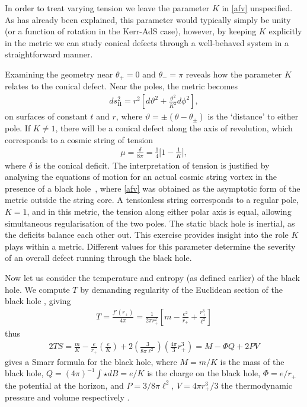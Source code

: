 \documentclass[
twoside,
openright,
frontopenright,
]{dmathesis}
\begin{document}
In order to treat varying tension we leave the parameter $K$ in \cref{afv}
unspecified. As has already been explained, this parameter would typically
simply be unity (or a function of rotation in the Kerr-AdS case), however, by
keeping $K$ explicitly in the metric we can study conical defects through a
well-behaved system in a straightforward manner.

Examining the geometry near $\theta_+ = 0$ and $\theta_- = \pi$ reveals how the
parameter $K$ relates to the conical defect. Near the poles, the metric becomes
\begin{align}
ds_{\mathrm{II}}^2 = r^2 \left[ d\vartheta^2 + \frac{\vartheta^2}{K^2} d\phi^2\right],
\end{align}
on surfaces of constant $t$ and $r$, where
$\vartheta = \pm (\theta - \theta_\pm)$ is the `distance' to either pole. If
$K\neq 1$, there will be a conical defect along the axis of revolution, which
corresponds to a cosmic string of tension
\begin{align}
\mu = \frac{\delta}{8\pi} = \frac14 \bigg[1-\frac{1}{K}\bigg],
\label{afvtension}
\end{align}
where $\delta$ is the conical deficit. The interpretation of tension is
justified by analysing the equations of motion for an actual cosmic string
vortex in the presence of a black hole~\cite{Achucarro:1995nu}, where
\eqref{afv} was obtained as the asymptotic form of the metric outside the string
core.  A tensionless string corresponds to a regular pole, $K=1$, and in this
metric, the tension along either polar axis is equal, allowing simultaneous
regularisation of the two poles. The static black hole is inertial, as the
deficits balance each other out. This exercise provides insight into the role
$K$ plays within a metric. Different values for this parameter determine the
severity of an overall defect running through the black hole.

Now let us consider the temperature and entropy (as defined earlier) of the
black hole. We compute $T$ by demanding regularity of the Euclidean section of
the black hole \cite{Gibbons:1976ue}, giving
\begin{align}
T = \frac{f'(r_+)}{4\pi} = \frac{1}{2\pi r_+^2} \left [
m - \frac{e^2}{r_+} + \frac{r_+^3}{\ell^2}\right]
\end{align}
thus 
\begin{align}
2TS = \frac{m}{K} - \frac{e}{r_+}\left (\frac{e}{K} \right ) 
+ 2\left (\frac{3}{8\pi \ell^2} \right ) \left (\frac{4\pi}{3} r_+^3\right ) 
= M - \Phi Q + 2PV
\end{align}
gives a Smarr formula \cite{Smarr:1972kt} for the black hole, where $M=m/K$ is
the mass of the black hole, $Q = (4\pi)^{-1}
\int \star dB=e/K$ is the charge on the black hole, 
$\Phi = e/r_+$ the potential at the horizon, and $P = 3/8\pi \ell^2$, 
$V = 4\pi r_+^3/3$ the thermodynamic pressure and volume respectively 
\cite{Teitelboim:1985dp,Kastor:2009wy,Dolan:2011xt}.
\end{document}
